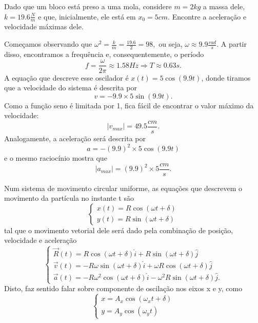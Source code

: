 \documentclass[physicsII_notes.tex]{subfiles}
\begin{document}
\begin{example}
	Dado que um bloco está preso a uma mola, considere \(m=2kg\) a massa dele, \(k = 19.6\frac{N}{m}\) e que, inicialmente,
	ele está em \(x_{0} = 5cm\). Encontre a aceleração e velocidade máximas dele.

	Começamos observando que \(\omega^{2} = \frac{k}{m} = \frac{19.6}{2} = 98,\) ou seja, \(\omega \approx 9.9 \frac{rad}{s}\).
	A partir disso, encontramos a frequência e, consequentemente, o período
	\[
		f = \frac{\omega }{2\pi }\approx 1.58Hz \Rightarrow T\approx 0.63s.
	\]
	A equação que descreve esse oscilador é \(x(t) = 5\cos{(9.9t)}\), donde tiramos que a velocidade do sistema é descrita por
	\[
		v = -9.9\times 5\sin{(9.9t)}.
	\]
	Como a função seno é limitada por 1, fica fácil de encontrar o valor máximo da velocidade:
	\[
		|v_{max}| = 49.5 \frac{cm}{s}.
	\]
	Analogamente, a aceleração será descrita por
	\[
		a = -(9.9)^{2}\times 5\cos{(9.9t)}
	\]
	e o mesmo raciocínio mostra que
	\[
		|a_{max}| = (9.9)^{2}\times 5 \frac{cm}{s}.
	\]
\end{example}
\begin{example}
	Num sistema de movimento circular uniforme, as equações que descrevem o movimento da partícula no instante t são
	\[
		\left\{\begin{array}{ll}
			x(t) = R\cos{(\omega t + \delta )} \\
			y(t) = R\sin{(\omega t + \delta )}
		\end{array}\right.
	\]
	tal que o movimento vetorial dele será dado pela combinação de posição, velocidade e aceleração
	\[
		\left\{\begin{array}{ll}
			\vec{R}(t) = R\cos{(\omega t + \delta )}\hat{i} + R\sin{(\omega t + \delta )}\hat{j}                \\
			\vec{v}(t) = -R\omega \sin{(\omega t + \delta )}\hat{i} + \omega R\cos{(\omega t + \delta )}\hat{j} \\
			\vec{a}(t) = -R\omega ^{2}\cos{(\omega t + \delta )}\hat{i} - \omega ^{2}R\sin{(\omega t + \delta )}\hat{j}.
		\end{array}\right.
	\]
	Disto, faz sentido falar sobre componente de oscilação nos eixos x e y, como
	\[
		\left\{\begin{array}{ll}
			x = A_{x}\cos{(\omega_{x}t + \delta )} \\
			y = A_{y}\cos{(\omega_{y}t)}
		\end{array}\right.
	\]
\end{example}
\end{document}
